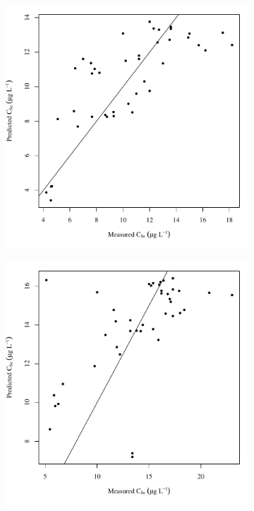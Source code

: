 \subfiguretop
\begin{landscape}
	\begin{figure}
		\begin{subfigure}{0.7\textwidth}
			\centering
			\includegraphics[width=\tableCustomSize]{"Figures/Results_DSR/Stochastic/Conc Model pred v meas D101C"}
		\end{subfigure}%
		\begin{subfigure}{0.7\textwidth}
			\centering
			\includegraphics[width=\tableCustomSize]{"Figures/Results_DSR/Stochastic/Conc Model pred v meas D106C"}

\end{subfigure}
\end{figure}
\end{landscape}
